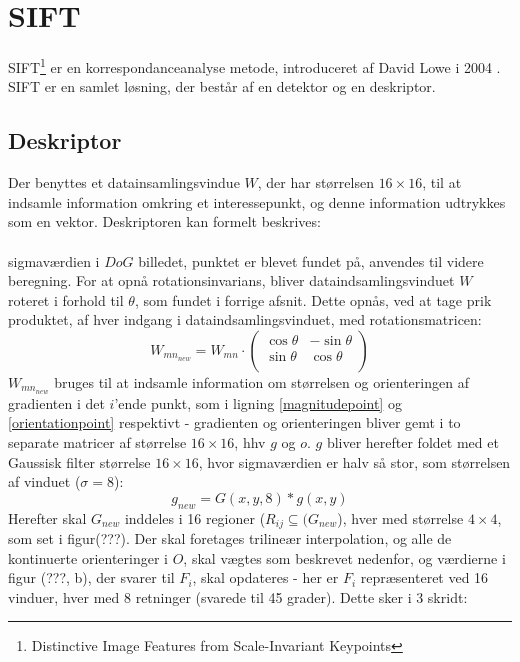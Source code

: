 \section{SIFT}
SIFT\footnote{Distinctive Image Features
from Scale-Invariant Keypoints} er en korrespondanceanalyse metode, introduceret af David Lowe i 2004 \cite{SIFT}. SIFT er en samlet løsning, der består af en detektor og en deskriptor.


\subsection{Deskriptor}
Der benyttes et datainsamlingsvindue $W$, der har størrelsen $16 \times 16$, til at indsamle information omkring et interessepunkt, og denne information udtrykkes som en vektor. Deskriptoren kan formelt beskrives:
\\
\\
sigmaværdien i $DoG$ billedet, punktet er blevet fundet på, anvendes til videre beregning. For at opnå rotationsinvarians, bliver dataindsamlingsvinduet $W$ roteret i forhold til $\theta$, som fundet i forrige afsnit. Dette opnås, ved at tage prik produktet, af hver indgang i dataindsamlingsvinduet, med rotationsmatricen:
\begin{equation}
W_{{mn}_{new}} = W_{mn} \cdot
\begin{pmatrix}
  \cos \theta & -\sin \theta \\
  \sin \theta & \cos \theta  \\
\end{pmatrix}
\label{rotaionmatrix}
\end{equation}
$W_{{mn}_{new}}$ bruges til at indsamle information om størrelsen og orienteringen af gradienten i det $i$'ende punkt, som i ligning \eqref{magnitudepoint} og \eqref{orientationpoint} respektivt - gradienten og orienteringen bliver gemt i to separate matricer af størrelse $16\times16$, hhv $g$ og $o$. $g$ bliver herefter foldet med et Gaussisk filter størrelse $16\times16$, hvor sigmaværdien er halv så stor, som størrelsen af vinduet ($\sigma=8$):
\begin{equation}
g_{new} = G(x,y,8) * g(x,y)
\label{gradientsmooth}
\end{equation}
Herefter skal $G_{new}$ inddeles i 16 regioner ($R_{ij} \subseteq (G_{new}$), hver med størrelse $4\times4$, som set i figur(???). Der skal foretages trilineær interpolation, og alle de kontinuerte orienteringer i $O$, skal vægtes som beskrevet nedenfor, og værdierne i figur (???, b), der svarer til $F_i$, skal opdateres - her er $F_i$ repræsenteret ved 16 vinduer, hver med 8 retninger (svarede til 45 grader). Dette sker i 3 skridt:
